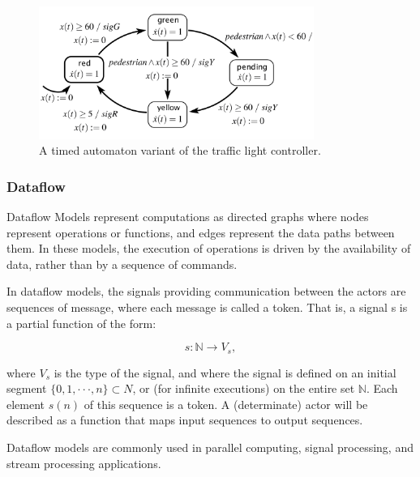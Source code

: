 \documentclass[12pt	]{article}
\begin{document}
\begin{figure}[h]
	\centering
	\includegraphics[width=0.8\textwidth]{Images/img2.png}
	\caption{A timed automaton variant of the traffic light controller.}
	\label{fig:A timed automaton variant of the traffic light controller}
\end{figure}








\subsubsection{Dataflow}
Dataflow Models represent computations as directed graphs where nodes represent operations or functions, and edges represent the data paths between them. In these models, the execution of operations is driven by the availability of data, rather than by a sequence of commands.

In dataflow models, the signals providing communication between the actors are sequences
of message, where each message is called a token. That is, a signal s is a partial
function of the form:

\begin{equation}
	s:\mathbb{N} \rightarrow V_s,
\end{equation}

where $V_s$ is the type of the signal, and where the signal is defined on an initial segment
$\{0, 1, ···, n\} \subset N$, or (for infinite executions) on the entire set $\mathbb{N}$. Each element $s(n)$ of this sequence is a token. A (determinate) actor will be described as a function that
maps input sequences to output sequences.

Dataflow models are commonly used in parallel computing, signal processing, and stream processing applications.
\end{document}
